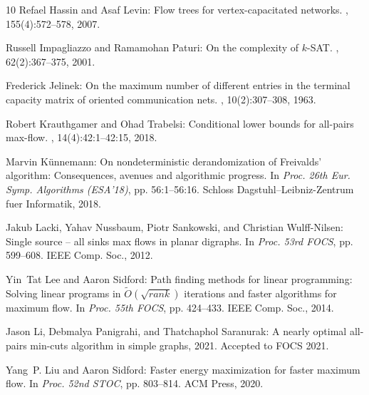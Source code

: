 \begin{thebibliography}{10}
{\sc Refael Hassin and Asaf Levin}: Flow trees for vertex-capacitated networks.
, 155(4):572--578, 2007.

{\sc Russell Impagliazzo and Ramamohan Paturi}: On the complexity of $k$-{SAT}.
, 62(2):367--375, 2001.

{\sc Frederick Jelinek}: On the maximum number of different entries in the
  terminal capacity matrix of oriented communication nets.
, 10(2):307--308, 1963.

{\sc Robert Krauthgamer and Ohad Trabelsi}: Conditional lower bounds for
  all-pairs max-flow.
, 14(4):42:1--42:15, 2018.
\newblock [\epfmtdoi{10.1145/3212510}]

{\sc Marvin K{\"{u}}nnemann}: On nondeterministic derandomization of
  {F}reivalds' algorithm: Consequences, avenues and algorithmic progress.
\newblock In {\em Proc. 26th Eur. Symp. Algorithms (ESA'18)}, pp. 56:1--56:16.
  Schloss Dagstuhl--Leibniz-Zentrum fuer Informatik, 2018.

{\sc Jakub Lacki, Yahav Nussbaum, Piotr Sankowski, and Christian Wulff-Nilsen}:
  Single source -- all sinks max flows in planar digraphs.
\newblock In {\em Proc. 53rd FOCS}, pp. 599--608. IEEE Comp. Soc., 2012.

{\sc Yin~Tat Lee and Aaron Sidford}: Path finding methods for linear
  programming: Solving linear programs in {${\widetilde
  O}(\sqrt{\mathit{rank}})$} iterations and faster algorithms for maximum flow.
\newblock In {\em Proc. 55th FOCS}, pp. 424--433. IEEE Comp. Soc., 2014.

{\sc Jason Li, Debmalya Panigrahi, and Thatchaphol Saranurak}: A nearly optimal
  all-pairs min-cuts algorithm in simple graphs, 2021.
\newblock Accepted to FOCS 2021.

{\sc Yang~P. Liu and Aaron Sidford}: Faster energy maximization for faster
  maximum flow.
\newblock In {\em Proc. 52nd STOC}, pp. 803--814. ACM Press, 2020.
\newblock [\epfmtdoi{10.1145/3357713.3384247}]


\end{thebibliography}
